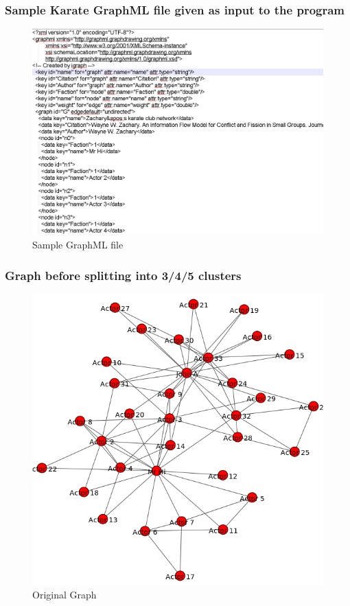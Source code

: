 \subsubsection{Sample Karate GraphML file given as input to the program}
\begin{figure}[ht]    
    \begin{center}
        \includegraphics[scale=0.7]{input2.png}
         \caption{Sample GraphML file}
        \label{a1}
    \end{center}
\end{figure}
\newpage
\subsubsection{Graph before splitting into 3/4/5 clusters}
\begin{figure}[ht]    
    \begin{center}
        \includegraphics[scale=0.7]{group2.png}
         \caption{Original Graph}
        \label{b2}
    \end{center}
\end{figure}
\newpage


